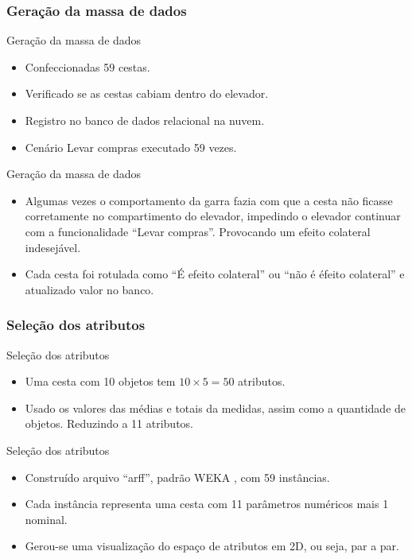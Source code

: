\documentclass[brazil]{beamer}
\begin{document}
\subsubsection{Geração da massa de dados}
\begin{frame}{Geração da massa de dados}
   \begin{itemize}
\justifying
      \item <1 ->Confeccionadas 59 cestas.
      \item <2 ->Verificado se as cestas cabiam dentro do elevador.
      \item <3 ->Registro no banco de dados relacional na nuvem.
      \item <4 ->Cenário Levar compras executado 59 vezes.
   \end{itemize}
\end{frame}

\begin{frame}{Geração da massa de dados}
   \begin{itemize}
\justifying
      \item <1 ->Algumas vezes o comportamento da garra fazia com que a cesta não ficasse corretamente no compartimento do elevador, impedindo o elevador continuar com a funcionalidade ``Levar compras''. Provocando um \alert{efeito colateral indesejável}.
      \item <2 ->Cada cesta foi rotulada como \alert{``É efeito colateral''} ou \alert{``não é éfeito colateral''} e atualizado valor no banco.
   \end{itemize}
\end{frame}


\subsubsection{Seleção dos atributos}
\begin{frame}{Seleção dos atributos}
   \begin{itemize}
\justifying
      \item <1 ->Uma cesta com 10 objetos tem \alert{$10 \times 5=50$ atributos}.
      \item <2 ->Usado os valores das médias e totais da medidas, assim como a quantidade de objetos. Reduzindo a \alert{11 atributos}.
   \end{itemize}
\end{frame}

\begin{frame}{Seleção dos atributos}
   \begin{itemize}
\justifying
      \item <1 ->Construído arquivo ``arff'', padrão WEKA \cite{Hall:2009}, com 59 instâncias.
      \item <2 ->Cada instância representa uma cesta com 11 parâmetros numéricos mais 1 nominal.
      \item <3 -> Gerou-se uma visualização do espaço de atributos em 2D, ou seja, par a par.
   \end{itemize}
\end{frame}
\end{document}
